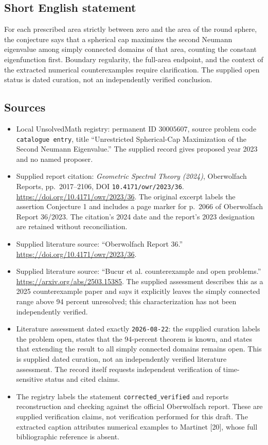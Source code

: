 \documentclass[11pt]{article}
\begin{document}
\subsection{Short English statement}
For each prescribed area strictly between zero and the area of the round sphere, the conjecture says that a spherical cap maximizes the second Neumann eigenvalue among simply connected domains of that area, counting the constant eigenfunction first. Boundary regularity, the full-area endpoint, and the context of the extracted numerical counterexamples require clarification. The supplied open status is dated curation, not an independently verified conclusion.
\subsection{Sources}
\begin{itemize}
\item Local UnsolvedMath registry: permanent ID \(30005607\), source problem code \texttt{catalogue entry}, title ``Unrestricted Spherical-Cap Maximization of the Second Neumann Eigenvalue.'' The supplied record gives proposed year 2023 and no named proposer.
\item Supplied report citation: \emph{Geometric Spectral Theory (2024)}, Oberwolfach Reports, pp.\ 2017--2106, DOI \texttt{10.4171/owr/2023/36}. \url{https://doi.org/10.4171/owr/2023/36}. The original excerpt labels the assertion Conjecture 1 and includes a page marker for p.\ 2066 of Oberwolfach Report 36/2023. The citation's 2024 date and the report's 2023 designation are retained without reconciliation.
\item Supplied literature source: ``Oberwolfach Report 36.'' \url{https://doi.org/10.4171/owr/2023/36}.
\item Supplied literature source: ``Bucur et al. counterexample and open problems.'' \url{https://arxiv.org/abs/2503.15385}. The supplied assessment describes this as a 2025 counterexample paper and says it explicitly leaves the simply connected range above 94 percent unresolved; this characterization has not been independently verified.
\item Literature assessment dated exactly \texttt{2026-08-22}: the supplied curation labels the problem open, states that the 94-percent theorem is known, and states that extending the result to all simply connected domains remains open. This is supplied dated curation, not an independently verified literature assessment. The record itself requests independent verification of time-sensitive status and cited claims.
\item The registry labels the statement \texttt{corrected\_verified} and reports reconstruction and checking against the official Oberwolfach report. These are supplied verification claims, not verification performed for this draft. The extracted caption attributes numerical examples to Martinet [20], whose full bibliographic reference is absent.
\end{itemize}
\end{document}
